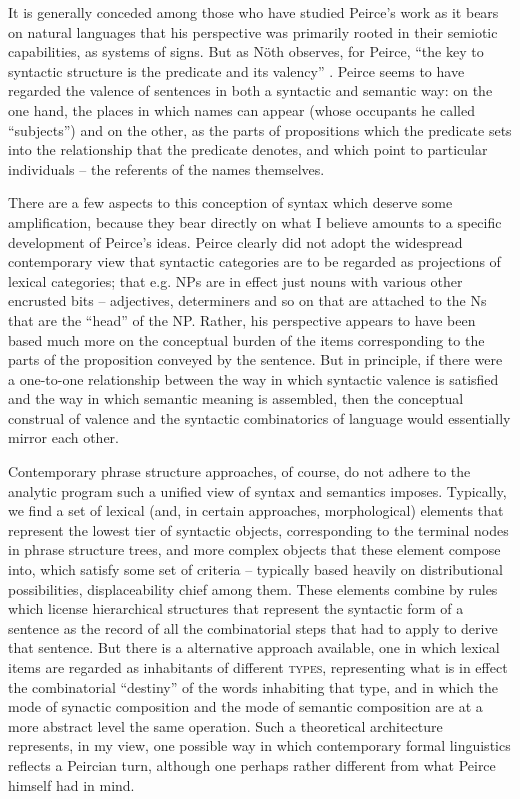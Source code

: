 \documentclass[output=paper,colorlinks,citecolor=brown]{langscibook}
\begin{document}
It is generally conceded among those who have studied Peirce's work as
it bears on natural languages that his perspective was primarily
rooted in their semiotic capabilities, as systems of signs. But as
Nöth observes, for Peirce, ``the key to syntactic structure is the
predicate and its valency'' \citeyearpar[7]{nothPeirce}. Peirce
seems to have regarded the valence of sentences in both a syntactic
and semantic way: on the one hand, the places in which names can
appear (whose occupants he called ``subjects'') and on the other, as the
parts of propositions which the predicate sets into the relationship
that the predicate denotes, and which point to particular
individuals -- the referents of the names themselves.

There are a few aspects to this conception of syntax which deserve
some amplification, because they bear directly on what I believe
amounts to a specific development of Peirce's ideas. Peirce clearly
did not adopt the widespread contemporary view that syntactic
categories are to be regarded as projections of lexical categories;
that e.g. NPs are in effect just nouns with various other encrusted
bits -- adjectives, determiners and so on that are attached to the Ns
that are the ``head'' of the NP. Rather, his perspective appears to have been
based much more on the conceptual burden of the items corresponding to
the parts of the proposition conveyed by the sentence. But in
principle, if there were a one-to-one relationship between the way in
which syntactic valence is satisfied and the way in which semantic
meaning is assembled, then the conceptual construal of valence and the
syntactic combinatorics of language would essentially mirror each
other.

Contemporary phrase structure approaches, of course, do not adhere to
the analytic program such a unified view of syntax and semantics
imposes. Typically, we find a set of lexical (and, in certain
approaches, morphological) elements that represent the lowest tier of
syntactic objects, corresponding to the terminal nodes in phrase
structure trees, and more complex objects that these element compose
into, which satisfy some set of criteria -- typically based heavily on
distributional possibilities, displaceability chief among them. These
elements combine by rules which license hierarchical structures that
represent the syntactic form of a sentence as the record of all the
combinatorial steps that had to apply to derive that sentence.  But
there is a alternative approach available, one in which lexical items
are regarded as inhabitants of different \textsc{types}, representing what
is in effect the combinatorial ``destiny'' of the words inhabiting that
type, and in which the mode of synactic composition and the mode of
semantic composition are at a more abstract level the same
operation. Such a theoretical architecture represents, in my view, one
possible way in which contemporary formal linguistics reflects a
Peircian turn, although one perhaps rather different from what Peirce
himself had in mind.
\end{document}
